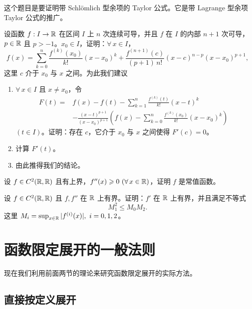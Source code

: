 \begin{exercise}
	\item 这个题目是要证明带 Schlömlich 型余项的 Taylor 公式。它是带 Lagrange 型余项 Taylor 公式的推广。

	设函数 $f:I\to\mathbb{R}$ 在区间 $I$ 上 $n$ 次连续可导，并且 $f$ 在 $I$ 的内部 $n+1$ 次可导，$p\in\mathbb{R}$ 且 $p>-1$。$x_0\in I$，证明：$\forall\,x\in I$，
	\[f(x)=\sum_{k=0}^{n}\frac{f^{(k)}(x_0)}{k!}(x-x_0)^k+\frac{f^{(n+1)}(c)}{(p+1)\,n!}(x-c)^{n-p}(x-x_0)^{p+1},\]
	这里 $c$ 介于 $x_0$ 与 $x$ 之间。为此我们建议
	\begin{enumerate}[label=\arabic*)]
		\item $\forall\,x\in I$ 且 $x\neq x_0$，令
		\[\begin{aligned}
		F(t)={}&f(x)-f(t)-\sum_{k=1}^{n}\frac{f^{(k)}(t)}{k!}(x-t)^k\\
		&-\frac{(x-t)^{p+1}}{(x-x_0)^{p+1}}\left(f(x)-\sum_{k=0}^{n}\frac{f^{(k)}(x_0)}{k!}(x-x_0)^k\right)
		\end{aligned}\]
		$(t\in I)$。证明：存在 $c$，它介于 $x_0$ 与 $x$ 之间使得 $F'(c)=0$。
		\item 计算 $F'(t)$。
		\item 由此推得我们的结论。
	\end{enumerate}
\end{exercise}

\begin{exercise}
	\item 设 $f\in C^2(\mathbb{R},\mathbb{R})$ 且有上界，$f''(x)\geqslant0\ (\forall\,x\in\mathbb{R})$，证明 $f$ 是常值函数。
\end{exercise}

\begin{exercise}
	\item 设 $f\in C^2(\mathbb{R},\mathbb{R})$ 且 $f,f''$ 在 $\mathbb{R}$ 上有界。证明：$f'$ 在 $\mathbb{R}$ 上有界，并且满足不等式
	\[M_1^2\leqslant M_0M_2.\]
	这里 $M_i=\sup_{x\in\R}|f^{(i)}(x)|,\ i=0,1,2$。
\end{exercise}

\section{函数限定展开的一般法则}

现在我们利用前面两节的理论来研究函数限定展开的实际方法。

\subsection{直接按定义展开}

